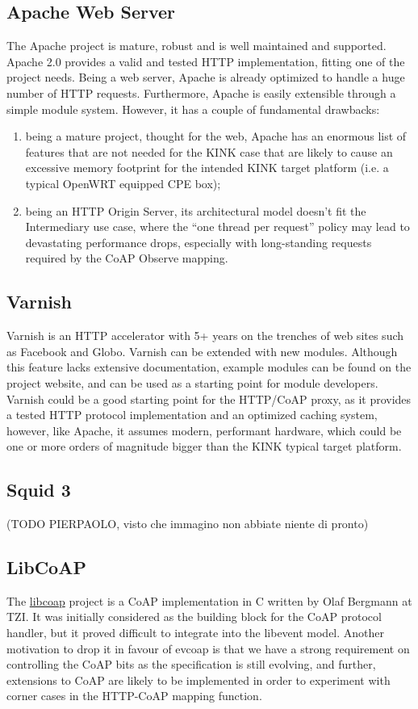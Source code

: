 \subsection{Apache Web Server}
The Apache project is mature, robust and is well maintained and supported. Apache 2.0 provides a valid and tested HTTP implementation, fitting one of the project needs.  Being a web server, Apache is already optimized to handle a huge number of HTTP requests.  Furthermore, Apache is easily extensible through a simple module system.  However, it has a couple of fundamental drawbacks:
\begin{enumerate}
\item being a mature project, thought for the web, Apache has an enormous list of features that are not needed for the KINK case that are likely to cause an excessive memory footprint for the intended KINK target platform (i.e. a typical OpenWRT equipped CPE box);
\item being an HTTP Origin Server, its architectural model doesn't fit the Intermediary use case, where the ``one thread per request'' policy may lead to devastating performance drops, especially with long-standing requests required by the CoAP Observe mapping.
\end{enumerate}

\subsection{Varnish}
Varnish is an HTTP accelerator with 5+ years on the trenches of web sites such as Facebook and Globo.  Varnish can be extended with new modules. Although this feature lacks extensive documentation, example modules can be found on the project website, and can be used as a starting point for module developers.
Varnish could be a good starting point for the HTTP/CoAP proxy, as it provides a tested HTTP protocol implementation and an optimized caching system, however, like Apache, it assumes modern, performant hardware, which could be one or more orders of magnitude bigger than the KINK typical target platform.

\subsection{Squid 3}

(TODO PIERPAOLO, visto che immagino non abbiate niente di pronto)

\subsection{LibCoAP}
The \href{http://sourceforge.net/projects/libcoap}{libcoap} project is a CoAP implementation in C written by Olaf Bergmann at TZI.
It was initially considered as the building block for the CoAP protocol handler, but it proved difficult to integrate into the libevent model.  Another motivation to drop it in favour of evcoap is that we have a strong requirement on controlling the CoAP bits as the specification is still evolving, and further, extensions to CoAP are likely to be implemented in order to experiment with corner cases in the HTTP-CoAP mapping function.


